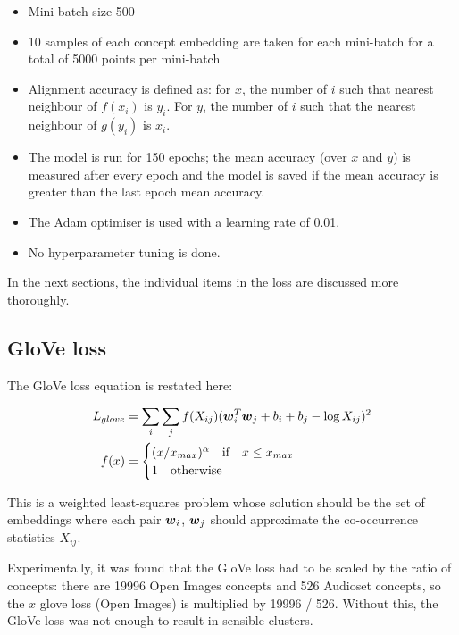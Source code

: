 \begin{itemize}
    \item Mini-batch size 500
    \item 10 samples of each concept embedding are taken for each mini-batch for a total of 5000 points per mini-batch
    \item Alignment accuracy is defined as: for $x$, the number of $i$ such that nearest neighbour of $f(x_i)$ is  $y_i$. For $y$, the number of $i$ such that the nearest neighbour of $g(y_i)$ is $x_i$. 
    \item The model is run for 150 epochs; the mean accuracy (over $x$ and $y$) is measured after every epoch and the model is saved if the mean accuracy is greater than the last epoch mean accuracy.
    \item The Adam optimiser is used with a learning rate of 0.01.
    \item No hyperparameter tuning is done. 
\end{itemize}

In the next sections, the individual items in the loss are discussed more thoroughly.

\subsection{GloVe loss}

The GloVe loss equation is restated here:

\begin{equation}
\begin{split}
L_{glove} &= \sum_i \sum_j f(X_{ij}) (\boldsymbol{w}_i^T \boldsymbol{w}_j + b_i + b_j - \log X_{ij})^2\\
f(x) &= \begin{cases}
(x/x_{max})^{\alpha}\quad \text{if} \quad x \le x_{max}\\
1\quad \text{otherwise} \quad
\end{cases}
\end{split}
\end{equation}

This is a weighted least-squares problem whose solution should be the set of embeddings where each pair $\boldsymbol{w}_i$, $\boldsymbol{w}_j$ should approximate the co-occurrence statistics $X_{ij}$. 

Experimentally, it was found that the GloVe loss had to be scaled by the ratio of concepts: there are 19996 Open Images concepts and 526 Audioset concepts, so the $x$ glove loss (Open Images) is multiplied by 19996 / 526. Without this, the GloVe loss was not enough to result in sensible clusters. 

